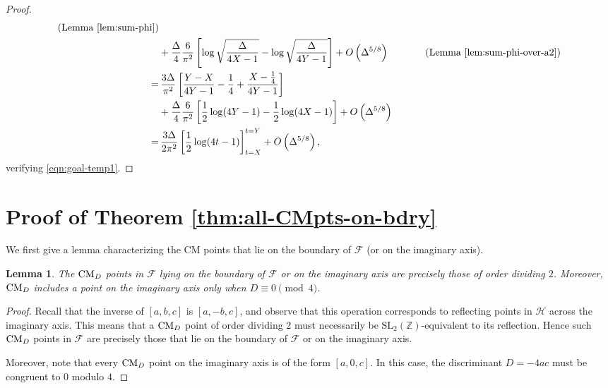 \documentclass[11pt,letterpaper,reqno]{amsart}
\newtheorem{lemma}[theorem]{Lemma}
\numberwithin{equation}{section}
\numberwithin{figure}{section}
\numberwithin{table}{section}
\newcommand{\lrp}[1]{\left(#1\right)}
\newcommand{\lrb}[1]{\left[#1\right]}
\newcommand{\ZZ}{\mathbb{Z}}
\newcommand{\SL}{\text{SL}}
\newcommand{\FF}{\mathcal{F}}
\newcommand{\HH}{\mathcal{H}}
\newcommand{\CM}{\textnormal{CM}}
\begin{document}
\begin{proof}
\begin{align}
        \quad\text{(Lemma \ref{lem:sum-phi})}
        \\
        &+
        \frac{\Delta}{4} \frac{6}{\pi^2}\lrb{ 
        \log \sqrt{\frac{\Delta}{4X-1}}
        - \log \sqrt{\frac{\Delta}{4Y-1}}
        } + O\lrp{\Delta^{5/8}} \quad \qquad\ \ \text{(Lemma \ref{lem:sum-phi-over-a2})} \\
        =&\, \frac{3\Delta}{\pi^2} \lrb{
            \frac{Y-X}{4Y-1} - \frac{1}{4} +  \frac{X-\frac14}{4Y-1}
        } 
        \\
        &+
        \frac{\Delta}{4} \frac{6}{\pi^2} \lrb{ 
        \frac12 \log (4Y-1) - \frac12 \log (4X-1)
        } + O\lrp{\Delta^{5/8}} \\
        =&\, \frac{3\Delta}{2\pi^2} \lrb{\frac12 \log(4t-1)}_{t=X}^{t=Y} + O\lrp{\Delta^{5/8}},
    \end{align}
    verifying \eqref{eqn:goal-temp1}.
\end{proof}


\section{Proof of Theorem \ref{thm:all-CMpts-on-bdry}} \label{sec:proof-of-thm1.1-(all-CMpts-on-bdry)}

We first give a lemma characterizing the CM points that lie on the boundary of $\FF$ (or on the imaginary axis).

\begin{lemma} \label{lem:location-of-order-2-CM-pts}
    The $\CM_D$ points in $\FF$ lying on the boundary of $\FF$ or on the imaginary axis are precisely those of order dividing $2$. 
    Moreover, $\CM_D$ includes a point on the imaginary axis only when $D \equiv 0 \pmod{4}$.
\end{lemma}

\begin{proof}
Recall that the inverse of $[a, b, c]$ is $[a, -b, c]$, and observe that this operation corresponds to reflecting points in $\HH$ across the imaginary axis. This means that a $\CM_D$ point of order dividing $2$ must necessarily be  $\SL_2(\ZZ)$-equivalent to its reflection. Hence such $\CM_D$ points in $\FF$ are precisely those that lie on the boundary of $\FF$ or on the imaginary axis. 

Moreover, note that every $\CM_D$ point on the imaginary axis is of the form $[a,0,c]$. In this case, the discriminant $D = -4ac$ must be congruent to $0$ modulo $4$.
\end{proof}
\end{document}
